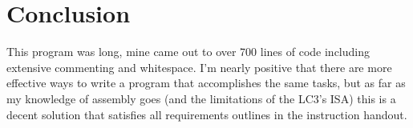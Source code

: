 \documentclass[a4paper,11pt]{article}
\begin{document}
 \section{Conclusion}
 This program was long, mine came out to over 700 lines of code including extensive commenting and whitespace. I'm nearly positive that there are more effective ways to write a program that accomplishes the same tasks, but as far as my knowledge of assembly goes (and the limitations of the LC3's ISA) this is a decent solution that satisfies all requirements outlines in the instruction handout. 
\end{document}
